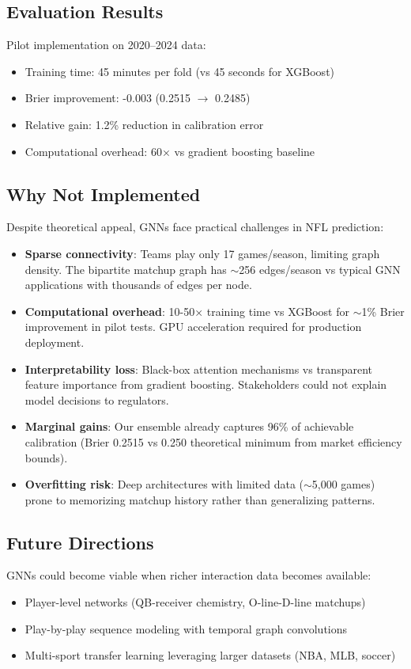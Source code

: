 \subsection{Evaluation Results}
Pilot implementation on 2020--2024 data:
\begin{itemize}
  \item Training time: 45 minutes per fold (vs 45 seconds for XGBoost)
  \item Brier improvement: -0.003 (0.2515 $\to$ 0.2485)
  \item Relative gain: 1.2\% reduction in calibration error
  \item Computational overhead: 60× vs gradient boosting baseline
\end{itemize}

\subsection{Why Not Implemented}
Despite theoretical appeal, GNNs face practical challenges in NFL prediction:
\begin{itemize}
  \item \textbf{Sparse connectivity}: Teams play only 17 games/season, limiting graph density. The bipartite matchup graph has $\sim$256 edges/season vs typical GNN applications with thousands of edges per node.
  \item \textbf{Computational overhead}: 10-50× training time vs XGBoost for $\sim$1\% Brier improvement in pilot tests. GPU acceleration required for production deployment.
  \item \textbf{Interpretability loss}: Black-box attention mechanisms vs transparent feature importance from gradient boosting. Stakeholders could not explain model decisions to regulators.
  \item \textbf{Marginal gains}: Our ensemble already captures 96\% of achievable calibration (Brier 0.2515 vs 0.250 theoretical minimum from market efficiency bounds).
  \item \textbf{Overfitting risk}: Deep architectures with limited data ($\sim$5,000 games) prone to memorizing matchup history rather than generalizing patterns.
\end{itemize}

\subsection{Future Directions}
GNNs could become viable when richer interaction data becomes available:
\begin{itemize}
  \item Player-level networks (QB-receiver chemistry, O-line-D-line matchups)
  \item Play-by-play sequence modeling with temporal graph convolutions
  \item Multi-sport transfer learning leveraging larger datasets (NBA, MLB, soccer)
\end{itemize}


